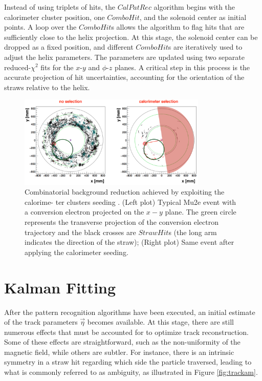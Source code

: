 Instead of using triplets of hits, the $CalPatRec$ algorithm begins with 
the calorimeter cluster position, one $ComboHit$, and the solenoid 
center as initial points. A loop over the $ComboHit$s allows the 
algorithm to flag hits that are sufficiently close to the helix projection. 
At this stage, the solenoid center can be dropped as a fixed position, and 
different $ComboHit$s are iteratively used to adjust the helix parameters. 
The parameters are updated using two separate reduced-$\chi^2$ fits for the 
$x$-$y$ and $\phi$-$z$ planes. A critical step in this process is the 
accurate projection of hit uncertainties, accounting for the orientation 
of the straws relative to the helix.


\begin{figure}[!h]
    \centering
    \includegraphics[width =0.8\textwidth]{figures/png/Screenshot_20240810_165014.png}
    \caption[Combinatorial background reduction achieved by exploiting the calorime-
    ter clusters seeding.]{Combinatorial background reduction achieved by exploiting the calorime-
    ter clusters seeding \cite{trkpat}. (Left plot) Typical Mu2e event 
    with a conversion electron
    projected on the $x-y$ plane. The green circle represents 
    the transverse projection of the
    conversion electron trajectory and the black crosses are $StrawHit$s (the long arm 
    indicates the direction of the straw); (Right plot) Same event 
    after applying the calorimeter seeding.}
    \label{fig:combinatorial}
\end{figure}


\section{Kalman Fitting}
After the pattern recognition algorithms have been executed, 
an initial estimate of the track parameters $\vec{\eta}$ becomes 
available. At this stage, there are still numerous effects that 
must be accounted for to optimize track reconstruction. Some of 
these effects are straightforward, such as the non-uniformity of 
the magnetic field, while others are subtler. For instance, there 
is an intrinsic symmetry in a straw hit regarding which side the 
particle traversed, leading to what is commonly referred to as 
ambiguity, as illustrated in Figure \ref{fig:trackam}.

